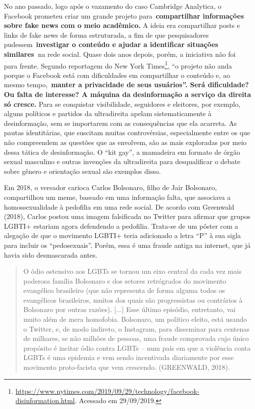 No ano passado, logo após o vazamento do caso Cambridge Analytica, o
Facebook prometeu criar um grande projeto para~\textbf{compartilhar
informações sobre fake news com o meio acadêmico.} A ideia era
compartilhar posts e links de fake news de forma estruturada, a fim de
que pesquisadores pudessem~\textbf{investigar o conteúdo e ajudar a
identificar situações similares~}na rede social. Quase dois anos depois,
porém, a iniciativa não foi para frente. Segundo reportagem do New York
Times\footnote{\url{https://www.nytimes.com/2019/09/29/technology/facebook-disinformation.html}.
  Acessado em 29/09/2019.}, ``o projeto não anda porque o Facebook está
com dificuldades em compartilhar o conteúdo e, ao mesmo
tempo,~\textbf{manter a privacidade de seus usuários''. Será
dificuldade? Ou falta de interesse? A máquina da desinformação a serviço
da direita só cresce.} Para se conquistar visibilidade, seguidores e
eleitores, por exemplo, alguns políticos e partidos da ultradireita
apelam sistematicamente à desinformação, sem se importarem com as
consequências que ela acarreta. As pautas identitárias, que suscitam
muitas controvérsias, especialmente entre os que não compreendem as
questões que as envolvem, são as mais exploradas por meio dessa tática
de desinformação. O ``kit gay'', a mamadeira em formato de órgão sexual
masculino e outras invenções da ultradireita para desqualificar o debate
sobre gênero e orientação sexual são exemplos disso.

Em 2018, o vereador carioca Carlos Bolsonaro, filho de Jair Bolsonaro,
compartilhou um meme, baseado em uma informação falta, que associava a
homossexualidade à pedofilia em uma rede social. De acordo com Greenwald
(2018), Carlos postou uma imagem falsificada no Twitter para afirmar que
grupos LGBTI+ estariam agora defendendo a pedofilia. Trata-se de um
pôster com a alegação de que o movimento LGBTI+ teria adicionado a letra
``P'' à sua sigla para incluir os ``pedosexuais''. Porém, essa é uma
fraude antiga na internet, que já havia sido desmascarada antes.

\begin{quote}
O ódio ostensivo aos LGBTs se tornou um eixo central da cada vez mais
poderosa família Bolsonaro e dos setores retrógrados do movimento
evangélico brasileiro (que não representa de forma alguma todos os
evangélicos brasileiros, muitos dos quais são progressistas ou
contrários à Bolsonaro por outras razões). {[}...{]} Esse último
episódio, entretanto, vai muito além de mera homofobia. Bolsonaro, um
político eleito, está usando o Twitter, e, de modo indireto, o
Instagram, para disseminar para centenas de milhares, se não milhões de
pessoas, uma fraude comprovada cujo único propósito é incitar ódio
contra LGBTs -- num país em que a violência conta LGBTs é uma epidemia e
vem sendo incentivada diariamente por esse movimento proto-facista que
vem crescendo. (GREENWALD, 2018).
\end{quote}


